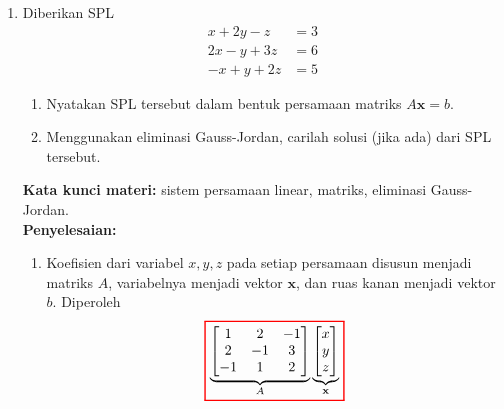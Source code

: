 \documentclass[10pt,openany,a4paper]{article}
\theoremstyle{definition}
\theoremstyle{definition}
\theoremstyle{plain}
\newenvironment{jawab}[2][tes]{%
\par\noindent\textbf{Kata kunci materi:} #1.\\
\textbf{Penyelesaian:} #2%
}{}
\begin{document}
\begin{enumerate}
\begin{jawab}[gradien garis, garis tegak lurus, persamaan garis, titik potong garis]
{\begin{enumerate}
\begin{align*}
                \frac{1}{2}x + \frac{5}{2} &= -2x + 5\\
                x + 5 &= -4x + 10\\
                5x &= 5 \implies x = 1.
            \end{align*}
            Substitusi $x=1$ ke persamaan $l_2$, diperoleh $y=-2(1)+5=3$ (dapat dicek pula $\frac{1}{2}(1)+\frac{5}{2}=3$). Jadi titik potong garis $l_1$ dan $l_2$ adalah $\colorlet{oldcolor}{.}
        \color{red}
        \setlength{\fboxrule}{1pt} \boxed{\color{oldcolor}(1,3)}\color{oldcolor}$.
        \end{enumerate}
    }
    \end{jawab}

    \item Diberikan SPL
    \begin{align*}
        x+2y-z &= 3\\
        2x-y+3z &= 6\\
        -x+y+2z &= 5
    \end{align*}
    \begin{enumerate}
        \item Nyatakan SPL tersebut dalam bentuk persamaan matriks $A\mathbf{x}=b$.
        \item Menggunakan eliminasi Gauss-Jordan, carilah solusi (jika ada) dari SPL tersebut.
    \end{enumerate}
    \begin{jawab}[sistem persamaan linear, matriks, eliminasi Gauss-Jordan]{
        \begin{enumerate}
            \item Koefisien dari variabel $x,y,z$ pada setiap persamaan disusun menjadi matriks $A$, variabelnya menjadi vektor $\mathbf{x}$, dan ruas kanan menjadi vektor $b$. Diperoleh
            \begin{align*}
                \colorlet{oldcolor}{.}
        \color{red}
        \setlength{\fboxrule}{1pt} \boxed{\color{oldcolor}\underbrace{\begin{bmatrix}
                    1 & 2 & -1\\
                    2 & -1 & 3\\
                    -1 & 1 & 2
                \end{bmatrix}}_{A}
                \underbrace{\begin{bmatrix}
                    x\\ y\\ z
                \end{bmatrix}}_{\mathbf{x}}
}
\end{align*}
\end{enumerate}}
\end{jawab}
\end{enumerate}
\end{document}
